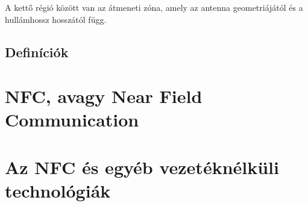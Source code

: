 \documentclass[french,12pt]{article}
\begin{document}
A kettő régió között van az átmeneti zóna, amely az antenna geometriájától és a 
hullámhossz hosszától függ.

\subsection{Definíciók}



\section[NFC]{NFC, avagy Near Field Communication}


\section{Az NFC és egyéb vezetéknélküli technológiák}
\end{document}
